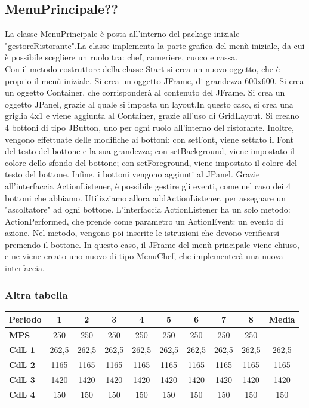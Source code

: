 \documentclass{FR16}
\begin{document}
\subsection{MenuPrincipale??}
La classe MenuPrincipale è posta all'interno del package iniziale "gestoreRistorante".La classe implementa la parte grafica del menù iniziale, da cui è possibile scegliere un ruolo tra: chef, cameriere, cuoco e cassa.\\ 
Con il metodo costruttore della classe Start si crea un nuovo oggetto, che è proprio il menù iniziale.
Si crea un oggetto JFrame, di grandezza 600x600.
Si crea un oggetto Container, che corrisponderà al contenuto del JFrame.
Si crea un oggetto JPanel, grazie al quale si imposta un layout.In questo caso, si crea una griglia 4x1 e viene aggiunta al Container, grazie all'uso di GridLayout.
Si creano 4 bottoni di tipo JButton, uno per ogni ruolo all'interno del ristorante. Inoltre, vengono effettuate delle modifiche ai bottoni: con setFont, viene settato il Font del testo del bottone e la sua grandezza; con setBackground, viene impostato il colore dello sfondo del bottone; con setForeground, viene impostato il colore del testo del bottone. Infine, i bottoni vengono aggiunti al JPanel.
Grazie all'interfaccia ActionListener, è possibile gestire gli eventi, come nel caso dei 4 bottoni che abbiamo. Utilizziamo allora addActionListener, per assegnare un "ascoltatore" ad ogni bottone.
L'interfaccia ActionListener ha un solo metodo: ActionPerformed, che prende come parametro un ActionEvent: un evento di azione.
Nel metodo, vengono poi inserite le istruzioni che devono verificarsi premendo il bottone.
In questo caso, il JFrame del menù principale viene chiuso, e ne viene creato uno nuovo di tipo MenuChef, che implementerà una nuova interfaccia.

\subsubsection{Altra tabella}
\begin{center}
\begin{tabular}{l c c c c c c c c c}
\arrayrulecolor{Azzurro}
\hline
{\bfseries Periodo} & 1 & 2 & 3 & 4 & 5 & 6 & 7 & 8 & Media\\
\hline
{\bfseries MPS} & 250 & 250 & 250 & 250 & 250 & 250 & 250 & 250 & \\
{\bfseries CdL 1} & 262,5 & 262,5 & 262,5 & 262,5 & 262,5 & 262,5 & 262,5 & 262,5 & 262,5\\
{\bfseries CdL 2} & 1165 & 1165 & 1165 & 1165 & 1165 & 1165 & 1165 & 1165 & 1165\\
{\bfseries CdL 3} & 1420 & 1420 & 1420 & 1420 & 1420 & 1420 & 1420 & 1420 & 1420\\
{\bfseries CdL 4} & 150 & 150 & 150 & 150 & 150 & 150 & 150 & 150 & 150\\
\hline
\end{tabular}
\end{center}
\end{document}
